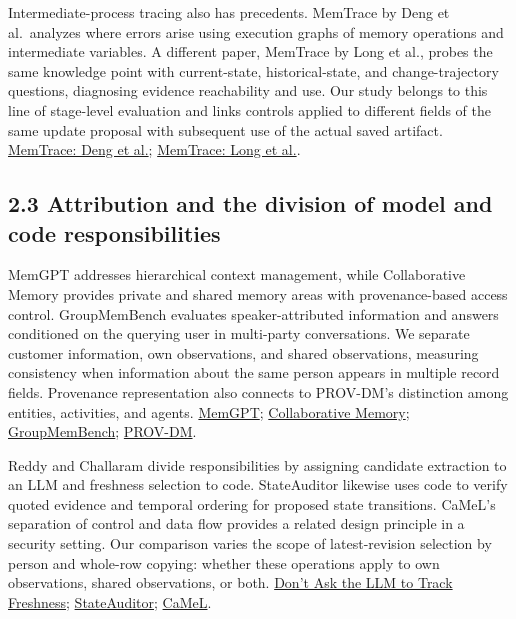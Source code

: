 \documentclass[10pt,a4paper]{article}
\begin{document}
Intermediate-process tracing also has precedents. MemTrace by Deng et al.~analyzes where errors arise using execution graphs of memory operations and intermediate variables. A different paper, MemTrace by Long et al., probes the same knowledge point with current-state, historical-state, and change-trajectory questions, diagnosing evidence reachability and use. Our study belongs to this line of stage-level evaluation and links controls applied to different fields of the same update proposal with subsequent use of the actual saved artifact. \href{https://arxiv.org/abs/2605.28732v1}{MemTrace: Deng et al.}; \href{https://arxiv.org/abs/2606.17328v1}{MemTrace: Long et al.}.

\subsection{2.3 Attribution and the division of model and code responsibilities}\label{paper-02-attribution-and-the-division-of-model-and-code-responsibilities}

MemGPT addresses hierarchical context management, while Collaborative Memory provides private and shared memory areas with provenance-based access control. GroupMemBench evaluates speaker-attributed information and answers conditioned on the querying user in multi-party conversations. We separate customer information, own observations, and shared observations, measuring consistency when information about the same person appears in multiple record fields. Provenance representation also connects to PROV-DM's distinction among entities, activities, and agents. \href{https://arxiv.org/abs/2310.08560v2}{MemGPT}; \href{https://arxiv.org/abs/2505.18279v1}{Collaborative Memory}; \href{https://arxiv.org/abs/2605.14498v2}{GroupMemBench}; \href{https://www.w3.org/TR/prov-dm/}{PROV-DM}.

Reddy and Challaram divide responsibilities by assigning candidate extraction to an LLM and freshness selection to code. StateAuditor likewise uses code to verify quoted evidence and temporal ordering for proposed state transitions. CaMeL's separation of control and data flow provides a related design principle in a security setting. Our comparison varies the scope of latest-revision selection by person and whole-row copying: whether these operations apply to own observations, shared observations, or both. \href{https://arxiv.org/abs/2606.01435v1}{Don't Ask the LLM to Track Freshness}; \href{https://arxiv.org/abs/2608.01619v1}{StateAuditor}; \href{https://arxiv.org/abs/2503.18813v2}{CaMeL}.
\end{document}

